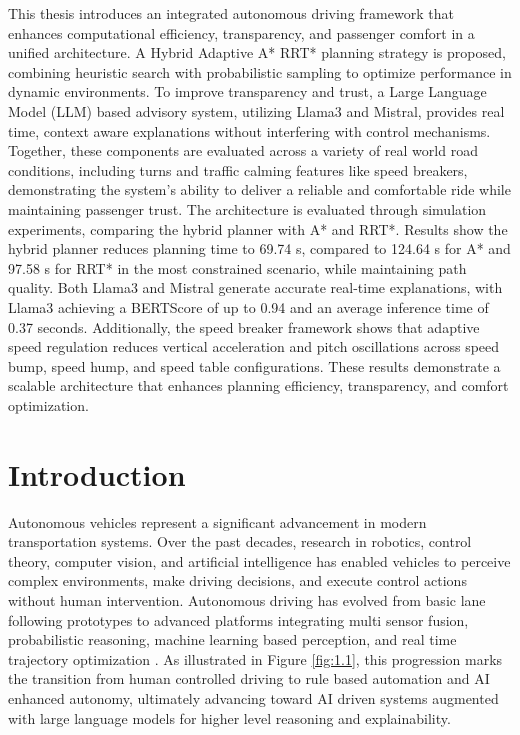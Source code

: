 \documentclass[a4paper,12pt,one side]{report}
\theoremstyle{definition}
\begin{document}
This thesis introduces an integrated autonomous driving framework that enhances computational efficiency, transparency, and passenger comfort in a unified architecture. A Hybrid Adaptive A* RRT* planning strategy is proposed, combining heuristic search with probabilistic sampling to optimize performance in dynamic environments. To improve transparency and trust, a Large Language Model (LLM) based advisory system, utilizing Llama3 and Mistral, provides real time, context aware explanations without interfering with control mechanisms. Together, these components are evaluated across a variety of real world road conditions, including turns and traffic calming features like speed breakers, demonstrating the system's ability to deliver a reliable and comfortable ride while maintaining passenger trust.
The architecture is evaluated through simulation experiments, comparing the hybrid planner with A* and RRT*. Results show the hybrid planner reduces planning time to 69.74 s, compared to 124.64 s for A* and 97.58 s for RRT* in the most constrained scenario, while maintaining path quality. Both Llama3 and Mistral generate accurate real-time explanations, with Llama3 achieving a BERTScore of up to 0.94 and an average inference time of 0.37 seconds. Additionally, the speed breaker framework shows that adaptive speed regulation reduces vertical acceleration and pitch oscillations across speed bump, speed hump, and speed table configurations. These results demonstrate a scalable architecture that enhances planning efficiency, transparency, and comfort optimization.


\pagebreak
{}
\chapter{Introduction}
Autonomous vehicles represent a significant advancement in modern transportation systems. Over the past decades, research in robotics, control theory, computer vision, and artificial intelligence has enabled vehicles to perceive complex environments, make driving decisions, and execute control actions without human intervention. Autonomous driving has evolved from basic lane following prototypes to advanced platforms integrating multi sensor fusion, probabilistic reasoning, machine learning based perception, and real time trajectory optimization \cite{mnih2015human}. As illustrated in Figure \ref{fig:1.1}, this progression marks the transition from human controlled driving to rule based automation and AI enhanced autonomy, ultimately advancing toward AI driven systems augmented with large language models for higher level reasoning and explainability.
\end{document}
